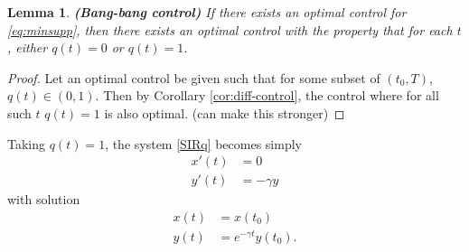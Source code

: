 \documentclass[english,12pt]{article}
\newtheorem{lem}{Lemma}
\begin{document}
\begin{lem} \label{lem:maxq}
    {\bf (Bang-bang control)}
    If there exists an optimal control for \eqref{eq:minsupp}, then there exists
    an optimal control with the property that for each $t$, either $q(t)=0$ or $q(t)=1$.
\end{lem}
\begin{proof}
    Let an optimal control be given such that for some subset of $(t_0,T)$, $q(t)\in(0,1)$.
    Then by Corollary \ref{cor:diff-control}, the control where for all such $t$ $q(t)=1$
    is also optimal.  (can make this stronger)
\end{proof}

Taking $q(t)=1$, the system \eqref{SIRq} becomes simply
\begin{subequations}
\begin{align}
    x'(t) & = 0 \\
    y'(t) & = - \gamma y
\end{align}
\end{subequations}
with solution
\begin{subequations} \label{qone}
\begin{align}
    x(t) & = x(t_0) \\
    y(t) & = e^{-\gamma t} y(t_0).
\end{align}
\end{subequations}
\end{document}

